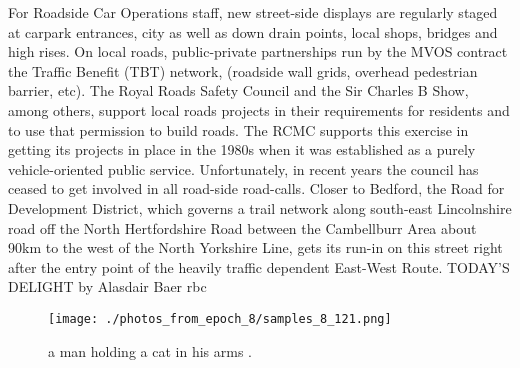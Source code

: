 \documentclass{article}%
\begin{document}
For Roadside Car Operations staff, new street{-}side displays are regularly staged at carpark entrances, city as well as down drain points, local shops, bridges and high rises.\newline%
On local roads, public{-}private partnerships run by the MVOS contract the Traffic Benefit (TBT) network, (roadside wall grids, overhead pedestrian barrier, etc).\newline%
The Royal Roads Safety Council and the Sir Charles B Show, among others, support local roads projects in their requirements for residents and to use that permission to build roads.\newline%
The RCMC supports this exercise in getting its projects in place in the 1980s when it was established as a purely vehicle{-}oriented public service. Unfortunately, in recent years the council has ceased to get involved in all road{-}side road{-}calls.\newline%
Closer to Bedford, the Road for Development District, which governs a trail network along south{-}east Lincolnshire road off the North Hertfordshire Road between the Cambellburr Area about 90km to the west of the North Yorkshire Line, gets its run{-}in on this street right after the entry point of the heavily traffic dependent East{-}West Route.\newline%
TODAY'S DELIGHT\newline%
by Alasdair Baer\newline%
rbc\newline%

%


\begin{figure}[h!]%
\centering%
\texttt{[image: ./photos\_from\_epoch\_8/samples\_8\_121.png]}%
\caption{a man holding a cat in his arms .}%
\end{figure}

%
\end{document}
